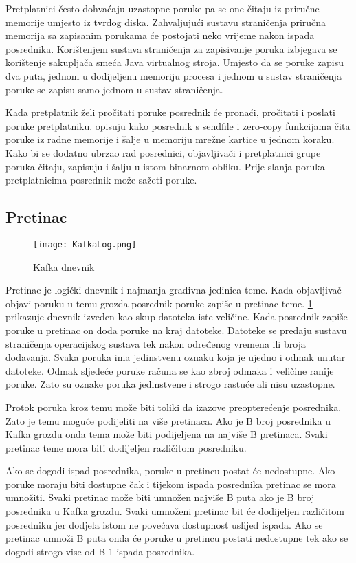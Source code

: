 \documentclass[times, utf8, diplomski, numeric]{fer}
\begin{document}
Pretplatnici često dohvaćaju uzastopne poruke pa se one čitaju iz priručne memorije umjesto iz tvrdog diska. Zahvaljujući sustavu straničenja priručna memorija sa zapisanim porukama će postojati neko vrijeme nakon ispada posrednika. Korištenjem sustava straničenja za zapisivanje poruka izbjegava se korištenje sakupljača smeća Java virtualnog stroja. Umjesto da se poruke zapisu dva puta, jednom u dodijeljenu memoriju procesa i jednom u sustav straničenja poruke se zapisu samo jednom u sustav straničenja.

Kada pretplatnik želi pročitati poruke posrednik će pronaći, pročitati i poslati poruke pretplatniku. \cite{linux-sendfile} \cite{java-zero-copy} opisuju kako posrednik s sendfile i zero-copy funkcijama čita poruke iz radne memorije i šalje u memoriju mrežne kartice u jednom koraku. Kako bi se dodatno ubrzao rad posrednici, objavljivači i pretplatnici grupe poruka čitaju, zapisuju i šalju u istom binarnom obliku. Prije slanja poruka pretplatnicima posrednik može sažeti poruke.

\subsection{Pretinac}

\begin{figure}[H]
    \centering
    \texttt{[image: KafkaLog.png]}
    \caption{Kafka dnevnik}
    \label{fig:kafka-log}
\end{figure}

Pretinac je logički dnevnik i najmanja gradivna jedinica teme. Kada objavljivač objavi poruku u temu grozda posrednik poruke zapiše u pretinac teme. \ref{fig:kafka-log} prikazuje dnevnik izveden kao skup datoteka iste veličine. Kada posrednik zapiše poruke u pretinac on doda poruke na kraj datoteke. Datoteke se predaju sustavu straničenja operacijskog sustava tek nakon određenog vremena ili broja dodavanja. Svaka poruka ima jedinstvenu oznaku koja je ujedno i odmak unutar datoteke. Odmak sljedeće poruke računa se kao zbroj odmaka i veličine ranije poruke. Zato su oznake poruka jedinstvene i strogo rastuće ali nisu uzastopne.

Protok poruka kroz temu može biti toliki da izazove preopterećenje posrednika. Zato je temu moguće podijeliti na više pretinaca. Ako je B broj posrednika u Kafka grozdu onda tema može biti podijeljena na najviše B pretinaca. Svaki pretinac teme mora biti dodijeljen različitom posredniku.

Ako se dogodi ispad posrednika, poruke u pretincu postat će nedostupne. Ako poruke moraju biti dostupne čak i tijekom ispada posrednika pretinac se mora umnožiti. Svaki pretinac može biti umnožen najviše B puta ako je B broj posrednika u Kafka grozdu. Svaki umnoženi pretinac bit će dodijeljen različitom posredniku jer dodjela istom ne povećava dostupnost uslijed ispada. Ako se pretinac umnoži B puta onda će poruke u pretincu postati nedostupne tek ako se dogodi strogo vise od B-1 ispada posrednika.
\end{document}
